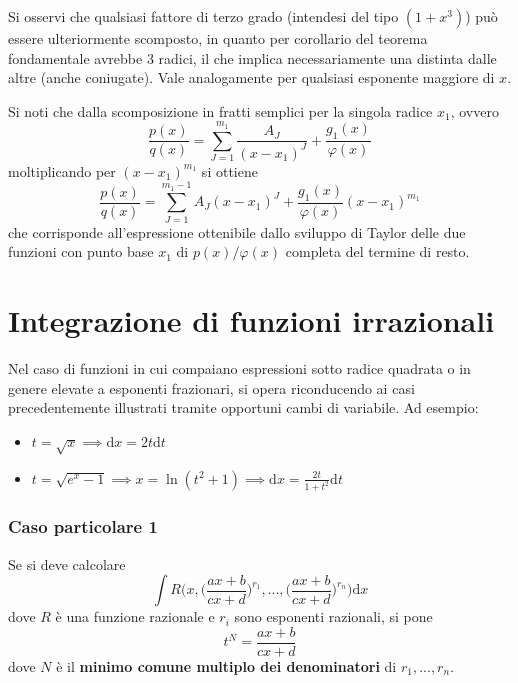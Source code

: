 \documentclass[10pt, oneside]{book}
\theoremstyle{plain}
\begin{document}
Si osservi che qualsiasi fattore di terzo grado (intendesi del tipo $(1 + x^3)$) può essere ulteriormente scomposto, in quanto per corollario del teorema fondamentale avrebbe 3 radici, il che implica necessariamente una distinta dalle altre (anche coniugate). Vale analogamente per qualsiasi esponente maggiore di $x$.

\begin{oss}
    Si noti che dalla scomposizione in fratti semplici per la singola radice $x_1$, ovvero
    \[\frac{p(x)}{q(x)} = \sum \limits_{J = 1}^{m_1}\frac{A_J}{(x-x_1)^J} + \frac{g_1(x)}{\varphi(x)}\]
    moltiplicando per $(x - x_1)^{m_1}$ si ottiene
    \[\frac{p(x)}{q(x)} = \sum \limits_{J = 1}^{m_1-1}A_J(x-x_1)^J + \frac{g_1(x)}{\varphi(x)}(x - x_1)^{m_1}\]
    che corrisponde all'espressione ottenibile dallo sviluppo di Taylor delle due funzioni con punto base $x_1$ di $p(x)\big/ \varphi(x)$ completa del termine di resto.
\end{oss}

\section{Integrazione di funzioni irrazionali}
Nel caso di funzioni in cui compaiano espressioni sotto radice quadrata o in genere elevate a esponenti frazionari, si opera riconducendo ai casi precedentemente illustrati tramite opportuni cambi di variabile. Ad esempio:
\begin{itemize}
\item $\displaystyle t = \sqrt{x} \implies \textrm{d}x = 2 t \textrm{d}t$
\item $\displaystyle t = \sqrt{e^x - 1} \implies x = \ln(t^2 +1) \implies \textrm{d}x = \frac{2t}{1+t^2}\textrm{d}t$
\end{itemize}
\subsubsection{Caso particolare 1}
Se si deve calcolare
\[\int R\bigg(x, \big(\frac{ax + b}{cx + d}\big)^{r_1}, ..., \big(\frac{ax + b}{cx + d}\big)^{r_n} \bigg)\textrm{d}x\]
dove $R$ è una funzione razionale e $r_i$ sono esponenti razionali, si pone
\[t^N = \frac{ax+b}{cx+d}\]
dove $N$ è il \textbf{minimo comune multiplo dei denominatori} di $r_1, ..., r_n$.
\end{document}
